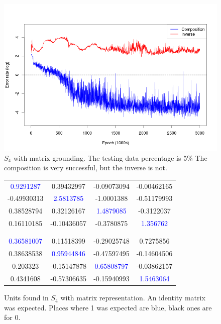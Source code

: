 \begin{figure}
\center
\caption{$S_4$ with matrix grounding. The testing data percentage is 5\% The composition is very successful, but the inverse is not.}
\label{graph:s4_matrix}
\includegraphics[width=\linewidth]{../img/s4_matrix.png}
\end{figure}

\begin{figure}
\center
\caption{Units found in $S_4$ with matrix representation. An identity matrix was expected. Places where 1 was expected are blue, black ones are for 0.}
\label{table:s4_matrix_unit}
\begin{tabular}{cccc}
\textcolor{blue}{0.9291287} & 0.39432997 & -0.09073094 & -0.00462165\\
-0.49930313 & \textcolor{blue}{2.5813785} & -1.0001388 & -0.51179993\\
0.38528794 & 0.32126167 & \textcolor{blue}{1.4879085} & -0.3122037\\
0.16110185 & -0.10436057 & -0.3780875 & \textcolor{blue}{1.356762}\\
 \\
\hline
\\
 \textcolor{blue}{0.36581007} & 0.11518399 & -0.29025748  & 0.7275856\\
0.38638538 & \textcolor{blue}{0.95944846} & -0.47597495 & -0.14604506\\
0.203323 & -0.15147878 & \textcolor{blue}{0.65808797} & -0.03862157\\
0.4341608 & -0.57306635 & -0.15940993 & \textcolor{blue}{1.5463064}
\end{tabular}
\end{figure}


